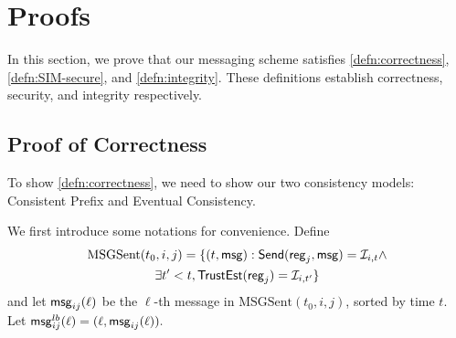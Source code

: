 \newcommand{\MSGS}{\text{MSGSent}}
\newcommand{\msgs}{\text{msgsent}}
\newcommand{\MSGR}{\text{MSGRecv}}
\newcommand{\cD}{\mathcal{D}}

\section{Proofs}
In this section, we prove that our messaging scheme satisfies \cref{defn:correctness}, \cref{defn:SIM-secure}, and \cref{defn:integrity}. These definitions establish correctness, security, and integrity respectively.
\subsection{Proof of Correctness}
To show \cref{defn:correctness}, we need to show our two consistency models: Consistent Prefix and Eventual Consistency.

We first introduce some notations for convenience. Define
\begin{multline*}
    \MSGS(t_0, i, j) = \{(t, \msg): \send(\reg_j, \msg) = \cI_{i, t} \land \\
             \exists t' < t, \trust(\reg_j) = \cI_{i, t'}\}
\end{multline*}
and let $\mathsf{msg}_{ij}(\ell)$ be the $\ell$-th message in $\MSGS(t_0, i, j)$, sorted by time $t$. Let $\mathsf{msg}_{ij}^{lb}(\ell) = (\ell, \mathsf{msg}_{ij}(\ell)).$

